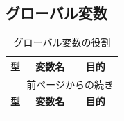 \documentclass[uplatex,dvipdfmx,a4paper]{jsarticle}
\begin{document}
\subsection{グローバル変数}
\begin{longtable}{lll}
    \caption{グローバル変数の役割}
    \label{tab:global_variables_long} \\
    
    \toprule
    \textbf{型} & \textbf{変数名} & \textbf{目的} \\
    \midrule
    \endfirsthead
    
    \multicolumn{3}{l}{\tablename~\thetable{} -- 前ページからの続き} \\
    \toprule
    \textbf{型} & \textbf{変数名} & \textbf{目的} \\
    \midrule
    \endhead
    
    \bottomrule
    \endlastfoot


\end{longtable}
\end{document}
